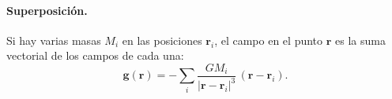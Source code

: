 \paragraph{Superposición.}
Si hay varias masas $M_i$ en las posiciones $\boldsymbol{r}_i$, el campo en
el punto $\boldsymbol{r}$ es la suma vectorial de los campos de cada una:
\begin{equation}
  \boldsymbol{g}(\boldsymbol{r})
  = -\sum_{i} \frac{G M_i}{\lvert \boldsymbol{r} - \boldsymbol{r}_i \rvert^{3}}
    \,(\boldsymbol{r} - \boldsymbol{r}_i) .
  \label{eq:campo_superposicion}
\end{equation}

